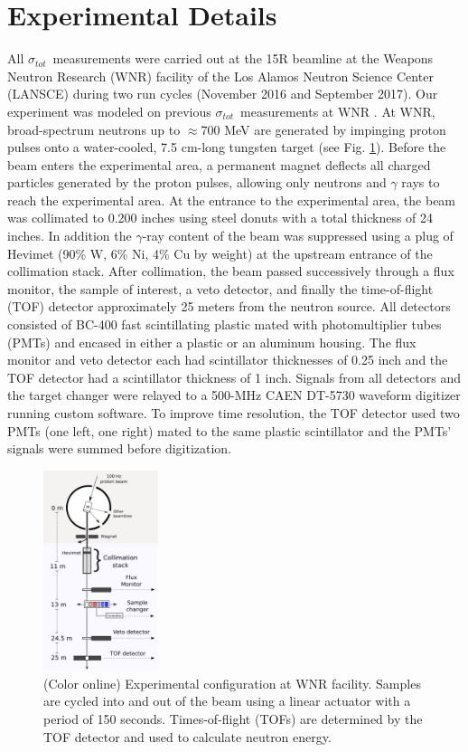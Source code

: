 \documentclass[twocolumn,secnumarabic,amssymb, nobibnotes, aps, prl,
superscriptaddress, nobalancelastpage, draft]{revtex4}
\newcommand{\tot}{\ensuremath{\sigma_{tot}}}
\begin{document}
\section{Experimental Details}
All \tot\ measurements were carried out at the 15R
beamline at the Weapons Neutron Research (WNR) facility of the Los Alamos
Neutron Science Center (LANSCE) during two run cycles (November 2016 and
September 2017). Our experiment was modeled on previous
\tot\ measurements at WNR \cite{Finlay1993,Abfalterer2001,Shane2010}.
At WNR,
broad-spectrum neutrons up
to $\approx$700 MeV are generated by impinging proton pulses onto a water-cooled, 7.5
cm-long tungsten target (see Fig. \ref{ExperimentalApparatus}). Before the beam
enters the experimental area, a
permanent magnet deflects all charged particles generated by the proton pulses, 
allowing only neutrons and $\gamma$ rays to reach the experimental area. At the
entrance to the experimental area, the beam was collimated to 0.200 inches using steel
donuts with a total thickness of 24 inches. In addition the $\gamma$-ray content of the beam
was suppressed using a plug of Hevimet (90\% W, 6\% Ni, 4\% Cu by weight)
at the upstream entrance of the collimation stack.
After collimation, the beam passed successively through a flux 
monitor, the sample of interest, a veto detector, and finally the 
time-of-flight (TOF) detector approximately 25 meters from the neutron source.
All detectors consisted of BC-400 fast scintillating plastic mated with 
photomultiplier tubes (PMTs) and encased in either a plastic or
an aluminum housing. The flux monitor and veto detector each had
scintillator thicknesses of 0.25 inch and the TOF detector had a
scintillator thickness of 1 inch. Signals from all detectors and
the target changer were relayed to a 500-MHz CAEN DT-5730 waveform digitizer
running custom software. To improve time resolution, the TOF detector used two
PMTs (one left, one right) mated to the same plastic scintillator and the PMTs' signals were 
summed before digitization.

\begin{figure}
    \includegraphics[width=0.3\textwidth]{figures/ExperimentalSetup.png}
    \caption{(Color online) Experimental configuration at WNR facility.
        Samples are cycled into and out of the beam
        using a linear actuator with a period of 150 seconds. Times-of-flight (TOFs) are
    determined by the TOF detector and used to calculate neutron energy.}
    \label{ExperimentalApparatus}
\end{figure}
\end{document}
